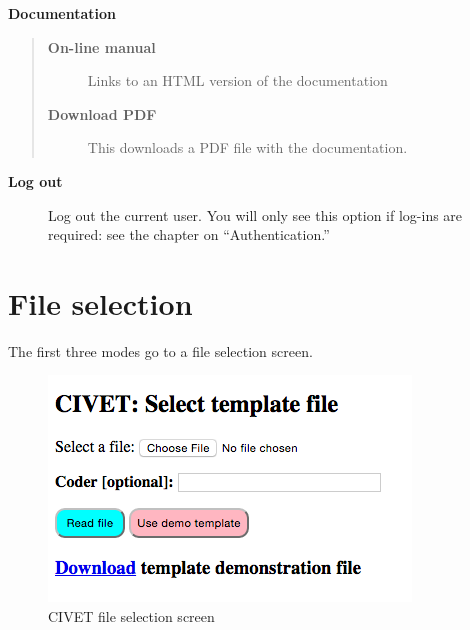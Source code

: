 \documentclass[letterpaper,10pt,english]{sphinxmanual}
\begin{document}
\textbf{Documentation}
\begin{quote}
\begin{description}
\item[{\textbf{On-line manual}}] \leavevmode
Links to an HTML version of the documentation

\item[{\textbf{Download PDF}}] \leavevmode
This downloads a PDF file with the documentation.

\end{description}
\end{quote}
\begin{description}
\item[{\textbf{Log out}}] \leavevmode
Log out the current user. You will only see this option if log-ins
are required: see the chapter on “Authentication.”

\end{description}


\section{File selection}
\label{homepage:file-selection}
The first three modes go to a file selection screen.
\begin{figure}[htbp]
\centering
\capstart

\includegraphics{fileselect.png}
\caption{CIVET file selection screen}\end{figure}
\end{document}
